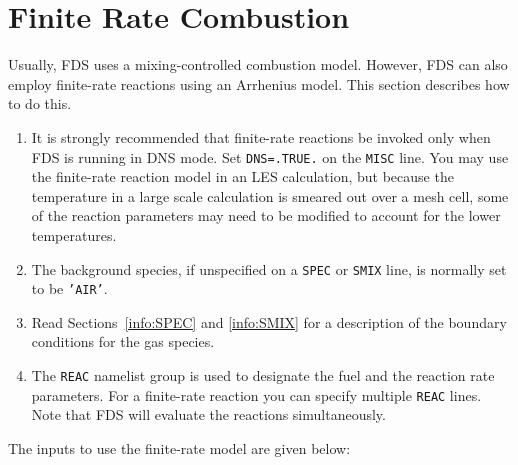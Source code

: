 \documentclass[11pt]{book}
\newcommand{\ct}{\tt\small}
\begin{document}
\section{Finite Rate Combustion}
\label{info:finite}

Usually, FDS uses a mixing-controlled combustion model. However, FDS can also employ finite-rate reactions using an Arrhenius model. This section describes how to do this.

\begin{enumerate}
\item It is strongly recommended that finite-rate reactions be invoked only
when FDS is running in DNS mode. Set {\ct DNS=.TRUE.} on the {\ct MISC} line.
You may use the finite-rate reaction model in an
LES calculation, but because the temperature in a large scale calculation
is smeared out over a mesh cell, some of the reaction parameters may need
to be modified to account for the lower temperatures.
\item The background species, if unspecified on a {\ct SPEC} or {\ct SMIX} line, is normally set to be {\ct 'AIR'}.
\item Read Sections~\ref{info:SPEC} and \ref{info:SMIX} for a description of the boundary
conditions for the gas species.
\item The {\ct REAC} namelist group is used to designate the fuel and the reaction rate
parameters.  For a finite-rate reaction you can specify multiple {\ct REAC} lines.  Note that FDS will evaluate the reactions simultaneously.
\end{enumerate}

\noindent The inputs to use the finite-rate model are given below:
\end{document}
